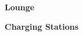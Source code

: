 \documentclass[a4paper]{article}
\begin{document}
\printGenericVSLHeader
\begin{center}
\begin{vsltext}{2.5cm}{4cm}

   \vspace{0.5cm} 

   \textbf{Lounge} 

    \vspace{2.5cm}

    \textbf{Charging Stations}
\end{vsltext}

\end{center}
\end{document}
